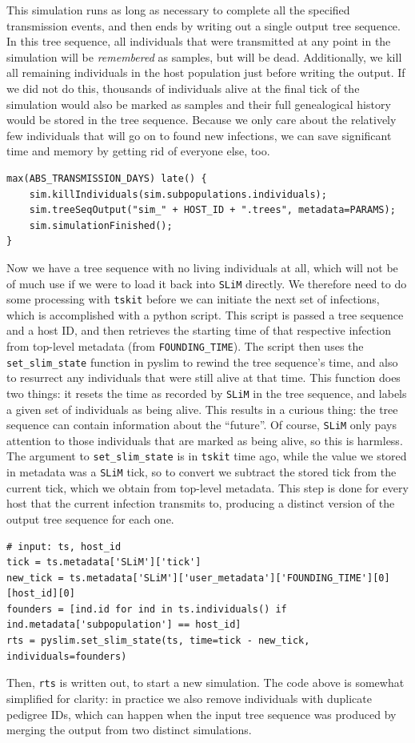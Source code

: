 \documentclass[12pt]{article}
\newcommand{\tskit}[0]{\texttt{tskit}\xspace}
\newcommand{\slim}[0]{\texttt{SLiM}\xspace}
\begin{document}
This simulation runs as long as necessary to complete all the specified transmission events,
and then ends by writing out a single output tree sequence.
In this tree sequence, all
individuals that were transmitted at any point in the simulation will be \textit{remembered} as samples, but will be dead. Additionally, we kill all remaining individuals in the host population
just before writing the output. If we did not do this, thousands of individuals alive at the final tick of the simulation would also be marked as samples and their full genealogical history
would be stored in the tree sequence. Because we only care about the relatively few individuals that will go on to found new infections, we can save significant time and memory
by getting rid of everyone else, too.
\begin{lstlisting}[language=slim, style=slimstyle, breaklines=true]
max(ABS_TRANSMISSION_DAYS) late() {
	sim.killIndividuals(sim.subpopulations.individuals);
	sim.treeSeqOutput("sim_" + HOST_ID + ".trees", metadata=PARAMS);
	sim.simulationFinished();
}
\end{lstlisting}

Now we have a tree sequence with no living individuals at all, which will not be of much use if we were to load it back into \slim directly. We therefore need to do some processing
with \tskit before we can initiate the next set of infections, which is accomplished with a python script.
This script is passed a tree sequence and a host ID,
and then retrieves the starting time of that respective infection from top-level metadata (from \verb|FOUNDING_TIME|).
The script then uses the \verb|set_slim_state| function in pyslim to rewind
the tree sequence's time, and also to resurrect any individuals that were still alive at that time.
This function does two things: it resets the time as recorded by \slim in the tree sequence,
and labels a given set of individuals as being alive.
This results in a curious thing: the tree sequence can contain information about the ``future''.
Of course, \slim only pays attention to those individuals that are marked as being alive,
so this is harmless.
The argument to \verb|set_slim_state| is in \tskit time ago,
while the value we stored in metadata was a \slim tick,
so to convert we subtract the stored tick from the current tick,
which we obtain from top-level metadata.
This step is done for every host that the current infection transmits to, producing
a distinct version of the output tree sequence for each one.
\begin{verbatim}
# input: ts, host_id
tick = ts.metadata['SLiM']['tick']
new_tick = ts.metadata['SLiM']['user_metadata']['FOUNDING_TIME'][0][host_id][0]
founders = [ind.id for ind in ts.individuals() if ind.metadata['subpopulation'] == host_id]
rts = pyslim.set_slim_state(ts, time=tick - new_tick, individuals=founders)
\end{verbatim}
Then, \verb|rts| is written out, to start a new simulation.
The code above is somewhat simplified for clarity:
in practice we also remove individuals with duplicate pedigree IDs,
which can happen when the input tree sequence was produced by merging
the output from two distinct simulations.
\end{document}
